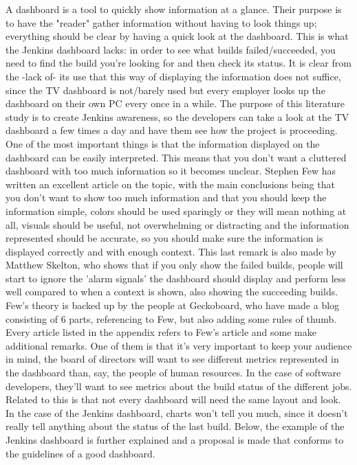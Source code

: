 \documentclass[10pt,a4paper]{report}
\begin{document}
A dashboard is a tool to quickly show information at a glance. Their purpose is to have the "reader" gather information without having to look things up; everything should be clear by having a quick look at the dashboard. This is what the Jenkins dashboard lacks: in order to see what builds failed/succeeded, you need to find the build you're looking for and then check its status. It is clear from the -lack of- its use that this way of displaying the information does not suffice, since the TV dashboard is not/barely used but every employer looks up the dashboard on their own PC every once in a while. 
The purpose of this literature study is to create Jenkins awareness, so the developers can take a look at the TV dashboard a few times a day and have them see how the project is proceeding.
One of the most important things is that the information displayed on the dashboard can be easily interpreted. This means that you don't want a cluttered dashboard with too much information so it becomes unclear.
Stephen Few has written an excellent article on the topic, with the main conclusions being that you don't want to show too much information and that you should keep the information simple, colors should be used sparingly or they will mean nothing at all, visuals should be useful, not overwhelming or distracting and the information represented should be accurate, so you should make sure the information is displayed correctly and with enough context. 
This last remark is also made by Matthew Skelton, who shows that if you only show the failed builds, people will start to ignore the 'alarm signals' the dashboard should display and perform less well compared to when a context is shown, also showing the succeeding builds. 
Few’s theory is backed up by the people at Geckoboard, who have made a blog consisting of 6 parts, referencing to Few, but also adding some rules of thumb. Every article listed in the appendix refers to Few’s article and some make additional remarks. 
One of them is that it’s very important to keep your audience in mind, the board of directors will want to see different metrics represented in the dashboard than, say, the people of human resources. 
In the case of software developers, they’ll want to see metrics about the build status of the different jobs. Related to this is that not every dashboard will need the same layout and look. 
In the case of the Jenkins dashboard, charts won’t tell you much, since it doesn’t really tell anything about the status of the last build. Below, the example of the Jenkins dashboard is further explained and a proposal is made that conforms to the guidelines of a good dashboard.
\end{document}
